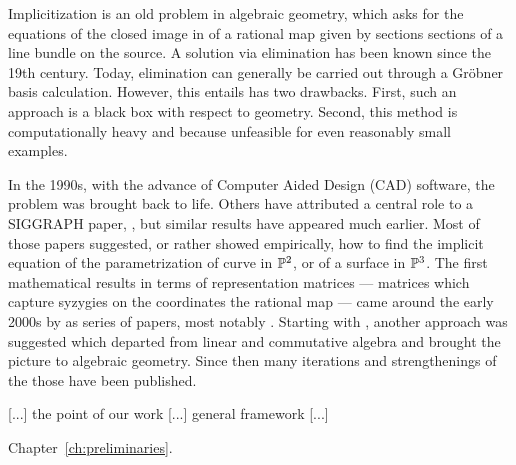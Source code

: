 \documentclass[fleqn,reqno]{amsart}
\numberwithin{first}{chapter}
\begin{document}

Implicitization is an old problem in algebraic geometry,
which asks for the equations of the closed image in of a rational map
given by sections sections of a line bundle on the source.
A solution via elimination has been known since the 19th century.
Today, elimination can generally be carried out through a Gr\"obner basis calculation.
However, this entails has two drawbacks.
First, such an approach is a black box with respect to geometry.
Second, this method is computationally heavy and because unfeasible for even reasonably
small examples.

In the 1990s, with the advance of Computer Aided Design (CAD) software,
the problem was brought back to life.
Others have attributed a central role to a SIGGRAPH paper, \citet{SC-95},
but similar results have appeared much earlier.
Most of those papers suggested, or rather showed empirically, how to find the implicit equation 
of the parametrization of curve in $\mathbb{P}^2$, or of a surface in $\mathbb{P}^3$.
The first mathematical results in terms of representation matrices ---
matrices which capture syzygies on the coordinates the rational map ---
came around the early 2000s by as series of papers, most notably \citet{CGZ-00}.
Starting with \citet{BJ-03}, another approach was suggested which departed from
linear and commutative algebra and brought the picture to algebraic geometry.
Since then many iterations and strengthenings of the those have been published.

[...] the point of our work [...] general framework [...]

Chapter~\ref{ch:preliminaries}.


\end{document}
